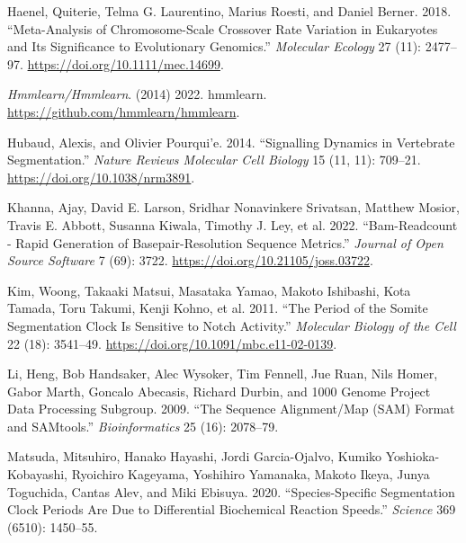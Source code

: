 \documentclass[
]{book}
\newlength{\cslhangindent}
\newlength{\cslentryspacingunit} %
\newenvironment{CSLReferences}[2] %
 {%
  \setlength{\parindent}{0pt}
  \ifodd #1
  \let\oldpar\par
  \def\par{\hangindent=\cslhangindent\oldpar}
  \fi
  \setlength{\parskip}{#2\cslentryspacingunit}
 }%
 {}
\begin{document}
\begin{CSLReferences}{1}{0}
\leavevmode{}%
Haenel, Quiterie, Telma G. Laurentino, Marius Roesti, and Daniel Berner. 2018. {``Meta-Analysis of Chromosome-Scale Crossover Rate Variation in Eukaryotes and Its Significance to Evolutionary Genomics.''} \emph{Molecular Ecology} 27 (11): 2477--97. \url{https://doi.org/10.1111/mec.14699}.

\leavevmode{}%
\emph{Hmmlearn/Hmmlearn}. (2014) 2022. {hmmlearn}. \url{https://github.com/hmmlearn/hmmlearn}.

\leavevmode{}%
Hubaud, Alexis, and Olivier Pourqui'e. 2014. {``Signalling Dynamics in Vertebrate Segmentation.''} \emph{Nature Reviews Molecular Cell Biology} 15 (11, 11): 709--21. \url{https://doi.org/10.1038/nrm3891}.

\leavevmode{}%
Khanna, Ajay, David E. Larson, Sridhar Nonavinkere Srivatsan, Matthew Mosior, Travis E. Abbott, Susanna Kiwala, Timothy J. Ley, et al. 2022. {``Bam-Readcount - Rapid Generation of Basepair-Resolution Sequence Metrics.''} \emph{Journal of Open Source Software} 7 (69): 3722. \url{https://doi.org/10.21105/joss.03722}.

\leavevmode{}%
Kim, Woong, Takaaki Matsui, Masataka Yamao, Makoto Ishibashi, Kota Tamada, Toru Takumi, Kenji Kohno, et al. 2011. {``The Period of the Somite Segmentation Clock Is Sensitive to {Notch} Activity.''} \emph{Molecular Biology of the Cell} 22 (18): 3541--49. \url{https://doi.org/10.1091/mbc.e11-02-0139}.

\leavevmode{}%
Li, Heng, Bob Handsaker, Alec Wysoker, Tim Fennell, Jue Ruan, Nils Homer, Gabor Marth, Goncalo Abecasis, Richard Durbin, and 1000 Genome Project Data Processing Subgroup. 2009. {``The {Sequence} Alignment/Map ({SAM}) Format and {SAMtools}.''} \emph{Bioinformatics} 25 (16): 2078--79.

\leavevmode{}%
Matsuda, Mitsuhiro, Hanako Hayashi, Jordi Garcia-Ojalvo, Kumiko Yoshioka-Kobayashi, Ryoichiro Kageyama, Yoshihiro Yamanaka, Makoto Ikeya, Junya Toguchida, Cantas Alev, and Miki Ebisuya. 2020. {``Species-Specific Segmentation Clock Periods Are Due to Differential Biochemical Reaction Speeds.''} \emph{Science} 369 (6510): 1450--55.


\end{CSLReferences}
\end{document}
